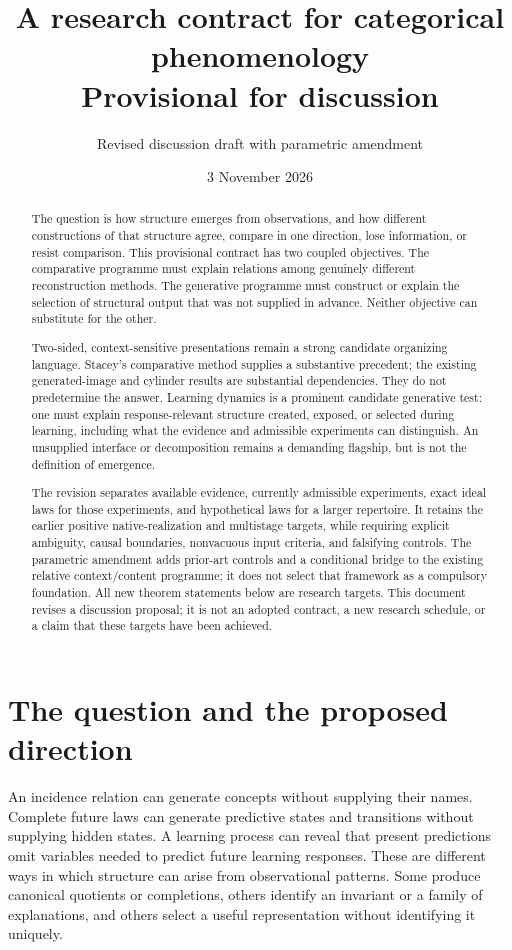 \documentclass[11pt]{article}
\title{A research contract for categorical phenomenology\\\large Provisional for discussion}
\author{Revised discussion draft with parametric amendment}
\date{3 November 2026}
\theoremstyle{remark}
\begin{document}
\maketitle
\begin{abstract}
The question is how structure emerges from observations, and how different constructions of that structure agree, compare in one direction, lose information, or resist comparison. This provisional contract has two coupled objectives. The comparative programme must explain relations among genuinely different reconstruction methods. The generative programme must construct or explain the selection of structural output that was not supplied in advance. Neither objective can substitute for the other.

Two-sided, context-sensitive presentations remain a strong candidate organizing language. Stacey's comparative method supplies a substantive precedent; the existing generated-image and cylinder results are substantial dependencies. They do not predetermine the answer. Learning dynamics is a prominent candidate generative test: one must explain response-relevant structure created, exposed, or selected during learning, including what the evidence and admissible experiments can distinguish. An unsupplied interface or decomposition remains a demanding flagship, but is not the definition of emergence.

The revision separates available evidence, currently admissible experiments, exact ideal laws for those experiments, and hypothetical laws for a larger repertoire. It retains the earlier positive native-realization and multistage targets, while requiring explicit ambiguity, causal boundaries, nonvacuous input criteria, and falsifying controls. The parametric amendment adds prior-art controls and a conditional bridge to the existing relative context/content programme; it does not select that framework as a compulsory foundation. All new theorem statements below are research targets. This document revises a discussion proposal; it is not an adopted contract, a new research schedule, or a claim that these targets have been achieved.
\end{abstract}
\tableofcontents

\section{The question and the proposed direction}
\label{sec:question}

An incidence relation can generate concepts without supplying their names. Complete future laws can generate predictive states and transitions without supplying hidden states. A learning process can reveal that present predictions omit variables needed to predict future learning responses. These are different ways in which structure can arise from observational patterns. Some produce canonical quotients or completions, others identify an invariant or a family of explanations, and others select a useful representation without identifying it uniquely.
\end{document}
